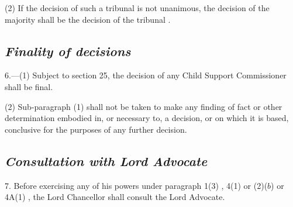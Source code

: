 \documentclass[12pt,a4paper]{article}
\begin{document}
(2) If the decision of such a tribunal is not unanimous, the decision of the majority shall be the decision of the tribunal%
.



\subsection*{\itshape Finality of decisions}

6.---(1) Subject to section 25, the decision of any Child Support Commissioner shall be final.

(2) Sub-paragraph (1)  shall not be taken to make any finding of fact or other determination embodied in, or necessary to, a decision, or on which it is based, conclusive for the purposes of any further decision.



\subsection*{\itshape Consultation with Lord Advocate}

7. Before exercising any of his powers under 
paragraph 1(3)%
, 
4(1) or (2)($b$) or 4A(1)%
, the Lord Chancellor shall consult the Lord Advocate.
\end{document}
